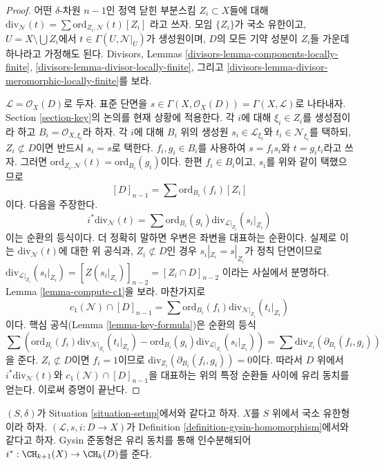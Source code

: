 \begin{proof}
어떤 $\delta$-차원 $n - 1$인 정역 닫힌 부분스킴 $Z_i \subset X$들에
대해 $\text{div}_\mathcal{N}(t) = \sum \text{ord}_{Z_i, \mathcal{N}}(t)[Z_i]$
라고 쓰자. 모임 $\{Z_i\}$가 국소 유한이고,
$U = X \setminus \bigcup Z_i$에서
$t \in \Gamma(U, \mathcal{N}|_U)$가 생성원이며, $D$의 모든 기약 성분이
$Z_i$들 가운데 하나라고 가정해도 된다. Divisors, Lemmas
\ref{divisors-lemma-components-locally-finite},
\ref{divisors-lemma-divisor-locally-finite}, 그리고
\ref{divisors-lemma-divisor-meromorphic-locally-finite}를 보라.

\medskip\noindent
$\mathcal{L} = \mathcal{O}_X(D)$로 두자. 표준 단면을
$s \in \Gamma(X, \mathcal{O}_X(D)) = \Gamma(X, \mathcal{L})$로 나타내자.
Section \ref{section-key}의 논의를 현재 상황에 적용한다.
각 $i$에 대해 $\xi_i \in Z_i$를 생성점이라 하고
$B_i = \mathcal{O}_{X, \xi_i}$라 하자. 각 $i$에 대해 $B_i$ 위의 생성원
$s_i \in \mathcal{L}_{\xi_i}$와 $t_i \in \mathcal{N}_{\xi_i}$를 택하되,
$Z_i \not \subset D$이면 반드시 $s_i = s$로 택한다.
$f_i, g_i \in B_i$를 사용하여 $s = f_i s_i$와 $t = g_i t_i$라고 쓰자.
그러면 $\text{ord}_{Z_i, \mathcal{N}}(t) = \text{ord}_{B_i}(g_i)$이다.
한편 $f_i \in B_i$이고, $s_i$를 위와 같이 택했으므로
$$
[D]_{n - 1} = \sum \text{ord}_{B_i}(f_i)[Z_i]
$$
이다. 다음을 주장한다.
$$
i^*\text{div}_\mathcal{N}(t) =
\sum \text{ord}_{B_i}(g_i) \text{div}_{\mathcal{L}|_{Z_i}}(s_i|_{Z_i})
$$
이는 순환의 등식이다. 더 정확히 말하면 우변은 좌변을 대표하는
순환이다. 실제로 이는 $\text{div}_\mathcal{N}(t)$에 대한 위 공식과,
$Z_i \not \subset D$인 경우 $s_i|_{Z_i} = s|_{Z_i}$가 정칙 단면이므로
$\text{div}_{\mathcal{L}|_{Z_i}}(s_i|_{Z_i}) = [Z(s_i|_{Z_i})]_{n - 2} =
[Z_i \cap D]_{n - 2}$
이라는 사실에서 분명하다. Lemma \ref{lemma-compute-c1}을 보라. 마찬가지로
$$
c_1(\mathcal{N}) \cap [D]_{n - 1} =
\sum \text{ord}_{B_i}(f_i) \text{div}_{\mathcal{N}|_{Z_i}}(t_i|_{Z_i})
$$
이다. 핵심 공식(Lemma \ref{lemma-key-formula})은 순환의 등식
$$
\sum \left(
\text{ord}_{B_i}(f_i) \text{div}_{\mathcal{N}|_{Z_i}}(t_i|_{Z_i}) -
\text{ord}_{B_i}(g_i) \text{div}_{\mathcal{L}|_{Z_i}}(s_i|_{Z_i}) \right) =
\sum \text{div}_{Z_i}(\partial_{B_i}(f_i, g_i))
$$
을 준다. $Z_i \not \subset D$이면 $f_i = 1$이므로
$\text{div}_{Z_i}(\partial_{B_i}(f_i, g_i)) = 0$이다. 따라서 $D$ 위에서
$i^*\text{div}_\mathcal{N}(t)$와 $c_1(\mathcal{N}) \cap [D]_{n - 1}$을
대표하는 위의 특정 순환들 사이에 유리 동치를 얻는다. 이로써 증명이
끝난다.
\end{proof}

\begin{lemma}
\label{lemma-gysin-factors}
$(S, \delta)$가 Situation \ref{situation-setup}에서와 같다고 하자.
$X$를 $S$ 위에서 국소 유한형이라 하자.
$(\mathcal{L}, s, i : D \to X)$가 Definition
\ref{definition-gysin-homomorphism}에서와 같다고 하자.
Gysin 준동형은 유리 동치를 통해 인수분해되어
$i^* : \CH_{k + 1}(X) \to \CH_k(D)$를 준다.
\end{lemma}

